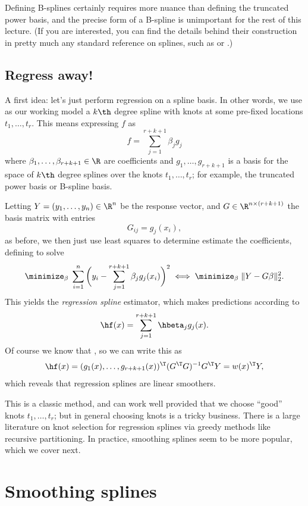 \documentclass{article}
\begin{document}
Defining B-splines certainly requires more nuance than defining the truncated
power basis, and the precise form of a B-spline is unimportant for the rest of
this lecture. (If you are interested, you can find the details behind their 
construction in pretty much any standard reference on splines, such as
\citet{deboor1978practical} or \citet{schumaker2007spline}.) 

\subsection{Regress away!}

A first idea: let's just perform regression on a spline basis. In other words,
we use as our working model a $k\th$ degree spline with knots at some pre-fixed 
locations $t_1,\dots,t_r$. This means expressing $f$ as  
\[
f = \sum_{j=1}^{r+k+1} \beta_j g_j
\]
where $\beta_1,\dots,\beta_{r+k+1} \in \R$ are coefficients and
$g_1,\dots,g_{r+k+1}$ is a basis for the space of $k\th$ degree splines over the
knots $t_1,\dots,t_r$; for example, the truncated power basis or B-spline basis.    

Letting $Y=(y_1,\dots,y_n) \in \R^n$ be the response vector, and $G \in \R^{n
  \times (r+k+1)}$ the basis matrix with entries   
\[
G_{ij} = g_j(x_i),
\]
as before, we then just use least squares to determine estimate the
coefficients, defining  to 
solve 
\[
\minimize_\beta \; \sum_{i=1}^n \bigg(y_i -\sum_{j=1}^{r+k+1} \beta_j g_j(x_i) 
\bigg)^2 \iff \minimize_\beta \; \|Y - G\beta\|_2^2.
\]
This yields the \emph{regression spline} estimator, which makes predictions
according to   
\[
\hf(x) = \sum_{j=1}^{r+k+1} \hbeta_j g_j(x).
\]
Of course we know that , so we can write
this as 
\[
\hf(x) = (g_1(x),\dots,g_{r+k+1}(x))^\T (G^\T G)^{-1} G^\T Y = w(x)^\T Y,  
\]
which reveals that regression splines are linear smoothers.

This is a classic method, and can work well provided that we choose ``good''
knots $t_1,\dots,t_r$; but in general choosing knots is a tricky business. There
is a large literature on knot selection for regression splines via greedy
methods like recursive partitioning. In practice, smoothing splines seem to be
more popular, which we cover next.

\section{Smoothing splines}
\end{document}
